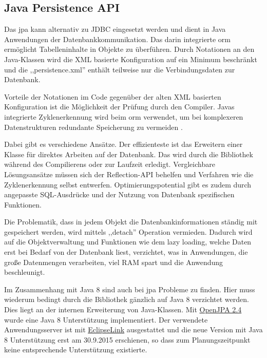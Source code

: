 \documentclass[oneside, ngerman, toc=bibliography,bibliography=totoc,listof=entryprefix, open=right,numbers=noenddot,fontsize=12pt]{scrbook}
\begin{document}
\subsection{Java Persistence API}
\label{chap:jpa}

Das \acrfull{jpa} kann alternativ zu {JDBC} eingesetzt werden und dient in Java Anwendungen der Datenbankkommunikation. Das darin integrierte \acrfull{orm} ermöglicht Tabelleninhalte in Objekte zu überführen. Durch Notationen an den Java-Klassen wird die XML basierte Konfiguration auf ein Minimum beschränkt und die ,,persistence.xml'' enthält teilweise nur die Verbindungsdaten zur Datenbank.

Vorteile der Notationen im Code gegenüber der alten {XML} basierten Konfiguration ist die Möglichkeit der Prüfung durch den Compiler. Javas integrierte Zyklenerkennung wird beim \acrshort{orm} verwendet, um bei komplexeren Datenstrukturen redundante Speicherung zu vermeiden \cite{inden2012weg}.


Dabei gibt es verschiedene Ansätze. Der effizienteste ist das Erweitern einer Klasse für direktes Arbeiten auf der Datenbank. Das wird durch die Bibliothek während des Compilierens oder zur Laufzeit erledigt. Vergleichbare  Lösungsansätze müssen sich der Reflection-API behelfen und Verfahren wie die Zyklenerkennung selbst entwerfen.
Optimierungspotential gibt es zudem durch angepasste SQL-Ausdrücke und der Nutzung von Datenbank spezifischen Funktionen.

Die Problematik, dass in jedem Objekt die Datenbankinformationen ständig mit gespeichert werden, wird mittels {,,detach''} Operation vermieden. Dadurch wird auf die Objektverwaltung und Funktionen wie dem {lazy loading}, welche Daten erst bei Bedarf von der Datenbank liest, verzichtet, was in Anwendungen, die große Datenmengen verarbeiten, viel RAM spart und die Anwendung beschleunigt.

Im  Zusammenhang mit Java 8 sind auch bei \acrshort{jpa} Probleme zu finden. Hier muss wiederum bedingt durch die Bibliothek gänzlich auf Java 8 verzichtet werden.
Dies liegt an der internen Erweiterung von Java-Klassen. Mit \href{http://openjpa.apache.org/openjpa-2.4.x.html}{OpenJPA 2.4} wurde eine Java 8 Unterstützung implementiert. Der verwendete Anwendungsserver ist mit \href{http://www.eclipse.org/eclipselink/}{EclipseLink} ausgestattet und die neue Version mit Java 8 Unterstützung erst am 30.9.2015 erschienen, so dass zum Planungszeitpunkt keine entsprechende Unterstützung existierte.
\end{document}
